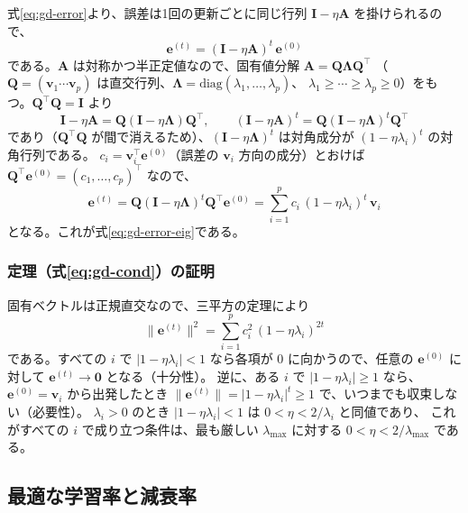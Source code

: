 式\eqref{eq:gd-error}より、誤差は1回の更新ごとに同じ行列 $\bm{I} - \eta\bm{A}$ を掛けられるので、
\begin{equation}
  \bm{e}^{(t)} = (\bm{I} - \eta\bm{A})^t\, \bm{e}^{(0)}
  \label{eq:gd-error-t}
\end{equation}
である。$\bm{A}$ は対称かつ半正定値なので、固有値分解 $\bm{A} = \bm{Q}\bm{\Lambda}\bm{Q}^\top$
（$\bm{Q} = (\bm{v}_1 \cdots \bm{v}_p)$ は直交行列、$\bm{\Lambda} = \mathrm{diag}(\lambda_1, \ldots, \lambda_p)$、
$\lambda_1 \geq \cdots \geq \lambda_p \geq 0$）をもつ。$\bm{Q}^\top\bm{Q} = \bm{I}$ より
\begin{equation*}
  \bm{I} - \eta\bm{A} = \bm{Q}(\bm{I} - \eta\bm{\Lambda})\bm{Q}^\top, \qquad
  (\bm{I} - \eta\bm{A})^t = \bm{Q}(\bm{I} - \eta\bm{\Lambda})^t\bm{Q}^\top
\end{equation*}
であり（$\bm{Q}^\top\bm{Q}$ が間で消えるため）、$(\bm{I} - \eta\bm{\Lambda})^t$ は対角成分が $(1 - \eta\lambda_i)^t$ の対角行列である。
$c_i = \bm{v}_i^\top\bm{e}^{(0)}$（誤差の $\bm{v}_i$ 方向の成分）とおけば $\bm{Q}^\top\bm{e}^{(0)} = (c_1, \ldots, c_p)^\top$ なので、
\begin{equation*}
  \bm{e}^{(t)} = \bm{Q}(\bm{I} - \eta\bm{\Lambda})^t\bm{Q}^\top\bm{e}^{(0)}
  = \sum_{i=1}^{p} c_i\,(1 - \eta\lambda_i)^t\,\bm{v}_i
\end{equation*}
となる。これが式\eqref{eq:gd-error-eig}である。

\subsubsection{定理（式\eqref{eq:gd-cond}）の証明}
固有ベクトルは正規直交なので、三平方の定理により
\begin{equation*}
  \|\bm{e}^{(t)}\|^2 = \sum_{i=1}^{p} c_i^2\,(1 - \eta\lambda_i)^{2t}
\end{equation*}
である。すべての $i$ で $|1 - \eta\lambda_i| < 1$ なら各項が $0$ に向かうので、任意の $\bm{e}^{(0)}$ に対して $\bm{e}^{(t)} \to \bm{0}$ となる（十分性）。
逆に、ある $i$ で $|1 - \eta\lambda_i| \geq 1$ なら、$\bm{e}^{(0)} = \bm{v}_i$ から出発したとき
$\|\bm{e}^{(t)}\| = |1 - \eta\lambda_i|^t \geq 1$ で、いつまでも収束しない（必要性）。
$\lambda_i > 0$ のとき $|1 - \eta\lambda_i| < 1$ は $0 < \eta < 2/\lambda_i$ と同値であり、
これがすべての $i$ で成り立つ条件は、最も厳しい $\lambda_{\max}$ に対する $0 < \eta < 2/\lambda_{\max}$ である。

\subsection{最適な学習率と減衰率}
\label{sec:app-gd-rate}

